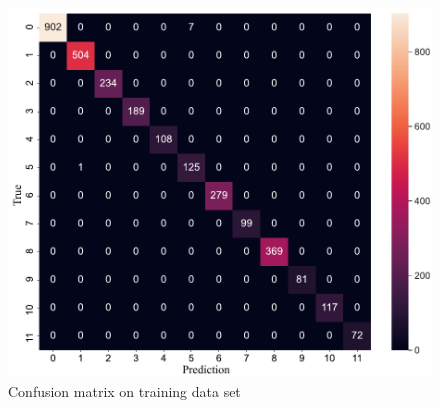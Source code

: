 \begin{figure}[!ht]
    \centering
    \includegraphics[width=.85\textwidth]{evaluation/imgs/5-confusion_matrix_train.pdf}
    \caption{Confusion matrix on training data set}
    \label{fig:5-confusion_matrix_train}
\end{figure}